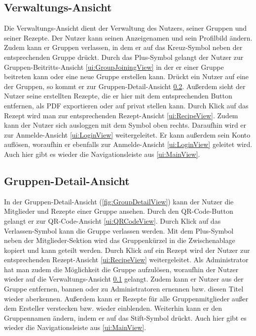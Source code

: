 \documentclass[parskip=full]{scrartcl}
\begin{document}
\subsection{Verwaltungs-Ansicht}
\label{ui:SettingsView}

Die Verwaltungs-Ansicht dient der Verwaltung des Nutzers, seiner Gruppen und seiner Rezepte. Der Nutzer kann seinen Anzeigenamen und sein Profilbild ändern. Zudem kann er Gruppen verlassen, in dem er auf das Kreuz-Symbol neben der entsprechenden Gruppe drückt. Durch das Plus-Symbol gelangt der Nutzer zur Gruppen-Beitritts-Ansicht \ref{ui:GroupJoiningView} in der er einer Gruppe beitreten kann oder eine neue Gruppe erstellen kann. Drückt ein Nutzer auf eine der Gruppen, so kommt er zur Gruppen-Detail-Ansicht \ref{ui:GroupDetailView}. Außerdem sieht der Nutzer seine erstellten Rezepte, die er hier mit dem entsprechenden Button entfernen, als PDF exportieren oder auf privat stellen kann. Durch Klick auf das Rezept wird man zur entsprechenden Rezept-Ansicht \ref{ui:RecipeView}.
Zudem kann der Nutzer sich ausloggen mit dem Symbol oben rechts. Daraufhin wird er zur Anmelde-Ansicht \ref{ui:LoginView} weitergeleitet. Er kann außerdem sein Konto auflösen, woraufhin er ebenfalls zur Anmelde-Ansicht \ref{ui:LoginView} geleitet wird. Auch hier gibt es wieder die Navigationsleiste aus \ref{ui:MainView}.

\subsection{Gruppen-Detail-Ansicht}
\label{ui:GroupDetailView}

In der Gruppen-Detail-Ansicht (\autoref{fig:GroupDetailView}) kann der Nutzer die Mitglieder und Rezepte einer Gruppe ansehen. Durch den QR-Code-Button gelangt er zur QR-Code-Ansicht \ref{ui:QRCodeView}. Durch Klick auf das Verlassen-Symbol kann die Gruppe verlassen werden. Mit dem Plus-Symbol neben der Mitglieder-Sektion wird das Gruppenkürzel in die Zwischenablage kopiert und kann geteilt werden. Durch Klick auf ein Rezept wird der Nutzer zur entsprechenden Rezept-Ansicht \ref{ui:RecipeView} weitergeleitet. Als Administrator hat man zudem die Möglichkeit die Gruppe aufzulösen, woraufhin der Nutzer wieder auf die Verwaltungs-Ansicht \ref{ui:SettingsView} gelangt. Zudem kann er Nutzer aus der Gruppe entfernen, bannen oder zu Administratoren ernennen bzw. diesen Titel wieder aberkennen. Außerdem kann er Rezepte für alle Gruppenmitglieder außer dem Ersteller verstecken bzw. wieder einblenden. Weiterhin kann er den Gruppennamen ändern, indem er auf das Stift-Symbol drückt. Auch hier gibt es wieder die Navigationsleiste aus \ref{ui:MainView}.
\end{document}

